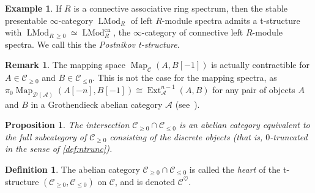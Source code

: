 \documentclass[12pt]{article}
\newtheorem{proposition}{Proposition}[subsection]
\theoremstyle{definition}
\newtheorem{definition}{Definition}[subsection]
\newtheorem{example}{Example}[subsection]
\newtheorem{remark}{Remark}[subsection]
\newcommand{\A}{\mathcal{A}}
\newcommand{\C}{\mathcal{C}}
\newcommand{\D}{\mathcal{D}}
\DeclareMathOperator{\LMod}{LMod}
\DeclareMathOperator{\Ext}{Ext}
\DeclareMathOperator{\Map}{Map}
\newcommand{\cn}{\mathrm{cn}}
\begin{document}
\begin{example}\label{ex:t'}
If $R$ is a connective associative ring spectrum, then the stable presentable $\infty$-category $\LMod_R$ of left $R$-module spectra admits a t-structure with $\LMod_{R\,\geq 0}\simeq\LMod_R^{\cn}$, the $\infty$-category of connective left $R$-module spectra.
We call this the {\em Postnikov t-structure}.
\end{example}

\begin{remark}
The mapping space $\Map_\C(A,B[-1])$ is actually
contractible for $A\in \C_{\geq 0}$ and $B\in \C_{\leq 0}$. This is not
the case for the mapping spectra, as
$\pi_{0}\Map_{\D(\A)}(A[-n],B[-1])\cong\Ext^{n-1}_\A(A,B)$ for any pair of objects $A$ and $B$ in a Grothendieck abelian category $\A$
(see~\cite[Proposition~1.3.5.6]{HA}).
\end{remark}
\begin{proposition}{\em \cite[Remark 1.2.1.12 and Warning 1.2.1.9]{HA}}
The intersection $\C_{\geq 0}\cap \C_{\leq 0}$ is an abelian category equivalent to the full subcategory of $\C_{\geq 0}$ consisting of the discrete objects (that is, $0$-truncated in the sense of \autoref{def:ntrunc}).
\end{proposition}



\begin{definition}
The abelian category $\C_{\geq 0}\cap \C_{\leq 0}$ is called the {\em heart}\index{${}^\heartsuit$} of the t-structure $(\C_{\geq 0},\C_{\leq 0})$ on $\C$, and is denoted $\C^{\heartsuit}$.
\end{definition}
\end{document}
